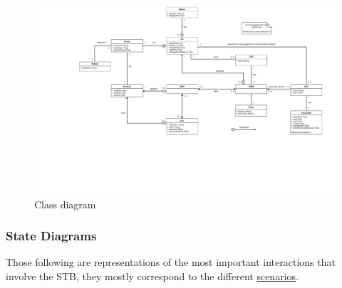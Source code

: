 \documentclass[11pt]{article}
\begin{document}
\begin{figure}[!ht]
    \centerline{
        \includegraphics[page={1}, width=1.1\linewidth, trim=7.24cm 9cm 2.28cm 0cm, clip]{UML.pdf} %
    }
    \caption{Class diagram}
\end{figure}

\newpage

\subsubsection{State Diagrams}

Those following are representations of the most important interactions that involve the STB, they mostly correspond to the different \hyperref[subsubsec:scenarios]{scenarios}.
\end{document}
